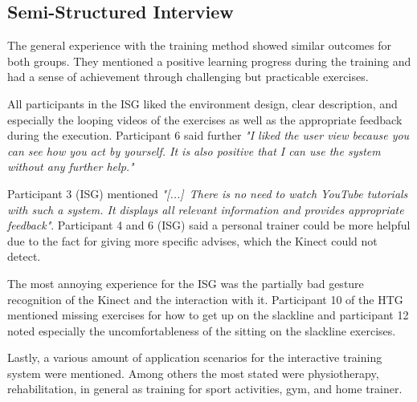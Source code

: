 \subsection{Semi-Structured Interview}
The general experience with the training method showed similar outcomes for both groups. 
They mentioned a positive learning progress during the training and had a sense of achievement through challenging but practicable exercises.

All participants in the ISG liked the environment design, clear description, and especially the looping videos of the exercises as well as the appropriate feedback during the execution.
Participant 6 said further \textit{"I liked the user view because you can see how you act by yourself. It is also positive that I can use the system without any further help."}

Participant 3 (ISG) mentioned \textit{"[...]~There is no need to watch YouTube tutorials with such a system. It displays all relevant information and provides appropriate feedback"}.
Participant 4 and 6 (ISG) said a personal trainer could be more helpful due to the fact for giving more specific advises, which the Kinect could not detect.

The most annoying experience for the ISG was the partially bad gesture recognition of the Kinect and the interaction with it.
Participant 10 of the HTG mentioned missing exercises for how to get up on the slackline and participant 12 noted especially the uncomfortableness of the sitting on the slackline exercises.

Lastly, a various amount of application scenarios for the interactive training system were mentioned.
Among others the most stated were physiotherapy, rehabilitation, in general as training for sport activities, gym, and home trainer.


